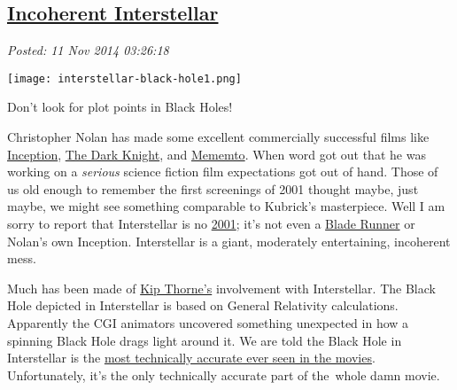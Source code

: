 %

\subsection*{\href{https://bakerjd99.wordpress.com/2014/11/10/incoherent-interstellar/}{Incoherent Interstellar}}


\noindent\emph{Posted: 11 Nov 2014 03:26:18}
\vspace{6pt}



\captionsetup[floatingfigure]{labelformat=empty}
\begin{floatingfigure}[l]{0.28\textwidth}
\centering
\texttt{[image: interstellar-black-hole1.png]}
\caption{Don't look for plot points in Black Holes!}
\label{fig:4883X0}
\end{floatingfigure} Christopher Nolan has made some excellent commercially successful films
like
\href{http://bakerjd99.wordpress.com/2010/07/28/the-20-seconds-that-ruined-inception/}{Inception},
\href{http://www.imdb.com/title/tt0468569/}{The Dark Knight}, and
\href{http://www.rottentomatoes.com/m/memento/}{Mememto}. When word got
out that he was working on a \emph{serious} science fiction film
expectations got out of hand. Those of us old enough to remember the
first screenings of 2001 thought maybe, just maybe, we might see
something comparable to Kubrick's masterpiece. Well I am sorry to report
that Interstellar is no
\href{http://www.rogerebert.com/reviews/great-movie-2001-a-space-odyssey-1968}{2001};
it's not even a \href{http://www.imdb.com/title/tt0083658/}{Blade
Runner} or Nolan's own Inception. Interstellar is a giant, moderately
entertaining, incoherent mess.

Much has been made of \href{http://www.its.caltech.edu/~kip/}{Kip
Thorne's} involvement with Interstellar. The Black Hole depicted in
Interstellar is based on General Relativity calculations. Apparently the
CGI animators uncovered something unexpected in how a spinning Black
Hole drags light around it. We are told the Black Hole in Interstellar
is the
\href{http://www.penny4nasa.org/2014/11/07/how-interstellar-black-hole-led-to-an-actual-scientific-discovery/}{most
technically accurate ever seen in the movies}. Unfortunately, it's the
only technically accurate part of the~whole damn movie.

